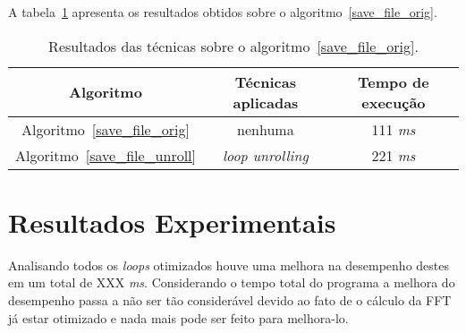 A tabela~\ref{tabela_save_file} apresenta os resultados obtidos sobre o
algoritmo~\ref{save_file_orig}.


\begin{table}[H]
  \caption{Resultados das técnicas sobre o algoritmo~\ref{save_file_orig}.}
  \label{tabela_save_file}
\begin{center}
  \begin{tabular}{c|c|c}
    Algoritmo & Técnicas aplicadas & Tempo de execução\\
    \hline
    Algoritmo~\ref{save_file_orig} & nenhuma & 111 \textit{ms} \\
    \hline
    Algoritmo~\ref{save_file_unroll} & \textit{loop unrolling} & 221 \textit{ms} \\
    \hline
  \end{tabular}
\end{center}
\end{table}



%

\section{Resultados Experimentais}

Analisando todos os \textit{loops} otimizados houve uma melhora na desempenho
destes em um total de XXX \textit{ms}. Considerando o tempo total do programa a
melhora do desempenho passa a não ser tão considerável devido ao fato de o
cálculo da FFT já estar otimizado e nada mais pode ser feito para melhora-lo.

%
